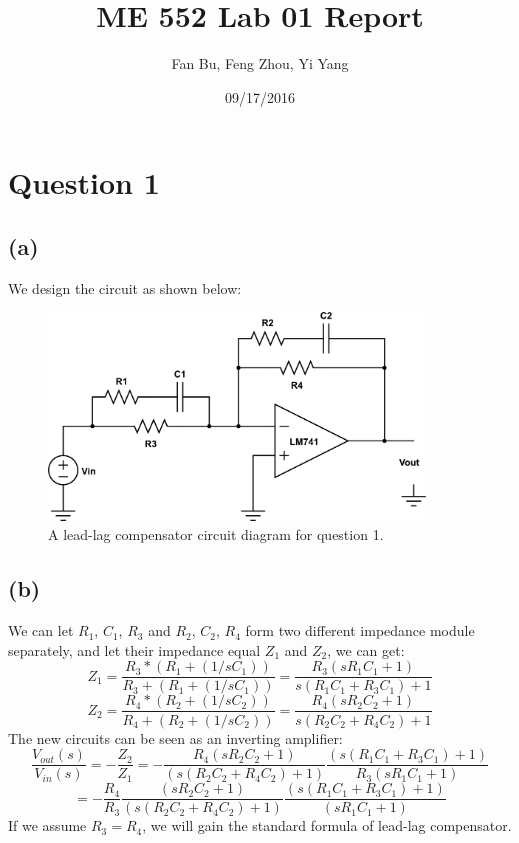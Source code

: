 \documentclass[letterpaper]{article}
\author{Fan Bu, Feng Zhou, Yi Yang}
\title{ME 552 Lab 01 Report}
\begin{document}
\date{09/17/2016}
\maketitle

\newcommand{\trace}{\mathrm{trace}}
\newcommand{\real}{\mathbb R}  %
\newcommand{\nat}{\mathbb N}   %
\newcommand{\cp}{\mathbb C}    %
\newcommand{\ds}{\displaystyle}
\newcommand{\mf}[2]{\frac{\ds #1}{\ds #2}}
\newcommand{\spanof}[1]{\textrm{span} \{ #1 \}}
\newcommand{\sol}[0]{\textbf{Solution: }}
\newcommand{\pf}[0]{\textbf{Proof:}}
\newcommand{\rme}[0]{\textrm{e}}
\newcommand{\Null}[1]{\textrm{Null}\{#1\}}
\parindent 0pt
\section*{Question 1}
\subsection*{(a)}
We design the circuit as shown below:\\
\begin{figure}[h]
\begin{center}
\includegraphics[width=10cm]{q1_circuitDiagram.png}
\end{center}
\caption{A lead-lag compensator circuit diagram for question 1.}
\label{q1_a}
\end{figure}
\subsection*{(b)}
We can let $R_1$, $C_1$, $R_3$ and $R_2$, $C_2$, $R_4$ form two different impedance module separately, and let their impedance equal $Z_1$ and $Z_2$, we can get:
$$Z_1 = \frac{R_3 * (R_1 + (1/sC_1))}{R_3 + (R_1 + (1/sC_1))} = \frac{R_3(sR_1C_1 +1)}{s(R_1C_1 + R_3C_1) + 1}$$
$$Z_2 = \frac{R_4 * (R_2 + (1/sC_2))}{R_4 + (R_2 + (1/sC_2))} = \frac{R_4(sR_2C_2 +1)}{s(R_2C_2 + R_4C_2) + 1}$$
The new circuits can be seen as an inverting amplifier:
$$\frac{V_{out}(s)}{V_{in}(s)} = - \frac{Z_2}{Z_1} = -  \frac{R_4(sR_2C_2 +1)}{(s(R_2C_2 + R_4C_2) + 1)}\frac{(s(R_1C_1 + R_3C_1) + 1)}{R_3(sR_1C_1 +1)} $$
$$=  -  \frac{R_4}{R_3}\frac{(sR_2C_2 +1)}{(s(R_2C_2 + R_4C_2) + 1)}\frac{(s(R_1C_1 + R_3C_1) + 1)}{(sR_1C_1 +1)} $$
If we assume $R_3 = R_4$, we will gain the standard formula of lead-lag compensator.
\end{document}
